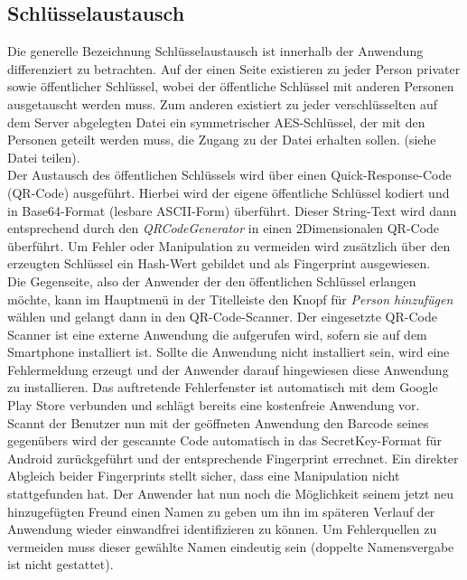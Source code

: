 \documentclass[10pt, a4paper]{scrreprt}
\begin{document}
\subsection{Schlüsselaustausch}
Die generelle Bezeichnung Schlüsselaustausch ist innerhalb der Anwendung differenziert zu betrachten. Auf der einen Seite existieren zu jeder Person privater sowie öffentlicher Schlüssel, wobei der öffentliche Schlüssel mit anderen Personen ausgetauscht werden muss. Zum anderen existiert zu jeder verschlüsselten auf dem Server abgelegten Datei ein symmetrischer AES-Schlüssel, der mit den Personen geteilt werden muss, die Zugang zu der Datei erhalten sollen. (siehe Datei teilen). \\
Der Austausch des öffentlichen Schlüssels wird über einen Quick-Response-Code (QR-Code) ausgeführt. Hierbei wird der eigene öffentliche Schlüssel kodiert und in Base64-Format (lesbare ASCII-Form) überführt. Dieser String-Text wird dann entsprechend durch den \textit{QRCodeGenerator} in einen 2Dimensionalen QR-Code überführt. Um Fehler oder Manipulation zu vermeiden wird zusätzlich über den erzeugten Schlüssel ein Hash-Wert gebildet und als Fingerprint ausgewiesen. \\
Die Gegenseite, also der Anwender der den öffentlichen Schlüssel erlangen möchte, kann im Hauptmenü in der Titelleiste den Knopf für \textit{Person hinzufügen} wählen und gelangt dann in den QR-Code-Scanner. Der eingesetzte QR-Code Scanner ist eine externe Anwendung die aufgerufen wird, sofern sie auf dem Smartphone installiert ist. Sollte die Anwendung nicht installiert sein, wird eine Fehlermeldung erzeugt und der Anwender darauf hingewiesen diese Anwendung zu installieren. Das auftretende Fehlerfenster ist automatisch mit dem Google Play Store verbunden und schlägt bereits eine kostenfreie Anwendung vor. \\
Scannt der Benutzer nun mit der geöffneten Anwendung den Barcode seines gegenübers wird der gescannte Code automatisch in das SecretKey-Format für Android zurückgeführt und der entsprechende Fingerprint errechnet. Ein direkter Abgleich beider Fingerprints stellt sicher, dass eine Manipulation nicht stattgefunden hat. Der Anwender hat nun noch die Möglichkeit seinem jetzt neu hinzugefügten Freund einen Namen zu geben um ihn im späteren Verlauf der Anwendung wieder einwandfrei identifizieren zu können. Um Fehlerquellen zu vermeiden muss dieser gewählte Namen eindeutig sein (doppelte Namensvergabe ist nicht gestattet).
\end{document}
